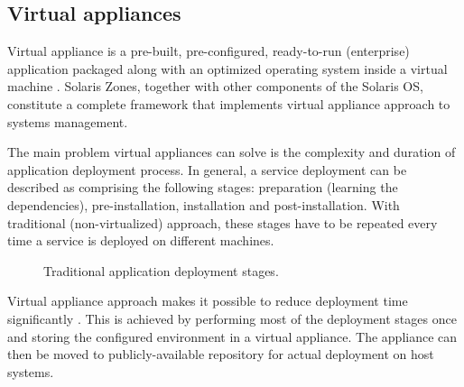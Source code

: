 \documentclass[11pt]{book}
\begin{document}
      \subsection{Virtual appliances}
      \label{sub:}

        Virtual appliance is a pre-built, pre-configured, ready-to-run (enterprise) application packaged along with an
        optimized operating system inside a virtual machine \cite{changhua}. Solaris Zones, together with other
        components of the Solaris OS, constitute a complete framework that implements virtual appliance approach to
        systems management.

        The main problem virtual appliances can solve is the complexity and duration of application deployment process.
        In general, a service deployment can be described as comprising the following stages: preparation (learning the
        dependencies), pre-installation, installation and post-installation. With traditional (non-virtualized)
        approach, these stages have to be repeated every time a service is deployed on different machines.

        \begin{figure}[H]
          \begin{center}
          \end{center}

          \caption{Traditional application deployment stages.}
        \end{figure}


        Virtual appliance approach makes it possible to reduce deployment time significantly \cite{changhua}. This is
        achieved by performing most of the deployment stages once and storing the configured environment in a virtual
        appliance. The appliance can then be moved to publicly-available repository for actual deployment on host
        systems.
\end{document}
